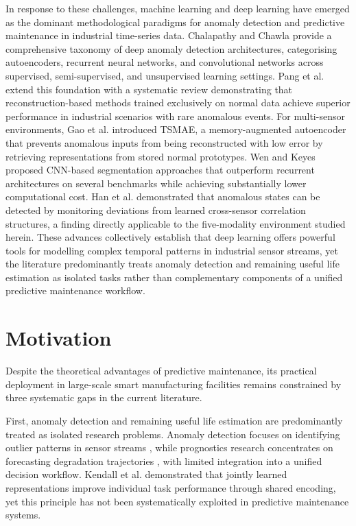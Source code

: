In response to these challenges, machine learning and deep learning have emerged as the dominant methodological paradigms for anomaly detection and predictive maintenance in industrial time-series data. Chalapathy and Chawla \cite{Chalapathy2019} provide a comprehensive taxonomy of deep anomaly detection architectures, categorising autoencoders, recurrent neural networks, and convolutional networks across supervised, semi-supervised, and unsupervised learning settings. Pang et al. \cite{pang_deep_2021} extend this foundation with a systematic review demonstrating that reconstruction-based methods trained exclusively on normal data achieve superior performance in industrial scenarios with rare anomalous events. For multi-sensor environments, Gao et al. \cite{Gao2022} introduced TSMAE, a memory-augmented autoencoder that prevents anomalous inputs from being reconstructed with low error by retrieving representations from stored normal prototypes. Wen and Keyes \cite{wen_time_2019} proposed CNN-based segmentation approaches that outperform recurrent architectures on several benchmarks while achieving substantially lower computational cost. Han et al. \cite{Han2022} demonstrated that anomalous states can be detected by monitoring deviations from learned cross-sensor correlation structures, a finding directly applicable to the five-modality environment studied herein. These advances collectively establish that deep learning offers powerful tools for modelling complex temporal patterns in industrial sensor streams, yet the literature predominantly treats anomaly detection and remaining useful life estimation as isolated tasks rather than complementary components of a unified predictive maintenance workflow.

\section{Motivation}

Despite the theoretical advantages of predictive maintenance, its practical deployment in large-scale smart manufacturing facilities remains constrained by three systematic gaps in the current literature.

First, anomaly detection and remaining useful life estimation are predominantly treated as isolated research problems. Anomaly detection focuses on identifying outlier patterns in sensor streams \cite{chen_unsupervised_2020}, while prognostics research concentrates on forecasting degradation trajectories \cite{nizam_real-time_2022}, with limited integration into a unified decision workflow. Kendall et al. \cite{kendall_multi-task_2017} demonstrated that jointly learned representations improve individual task performance through shared encoding, yet this principle has not been systematically exploited in predictive maintenance systems.

